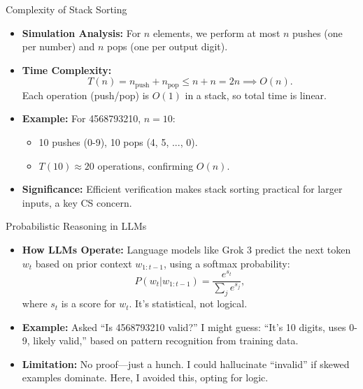 \begin{frame}{Complexity of Stack Sorting}
    \begin{itemize}
        \item \textbf{Simulation Analysis:} For \( n \) elements, we perform at most \( n \) pushes (one per number) and \( n \) pops (one per output digit).
        \item \textbf{Time Complexity:}
        \[
        T(n) = n_{\text{push}} + n_{\text{pop}} \leq n + n = 2n \implies O(n).
        \]
        Each operation (push/pop) is \( O(1) \) in a stack, so total time is linear.
        \item \textbf{Example:} For 4568793210, \( n = 10 \):
        \begin{itemize}
            \item 10 pushes (0-9), 10 pops (4, 5, ..., 0).
            \item \( T(10) \approx 20 \) operations, confirming \( O(n) \).
        \end{itemize}
        \item \textbf{Significance:} Efficient verification makes stack sorting practical for larger inputs, a key CS concern.
    \end{itemize}
\end{frame}

\begin{frame}{Probabilistic Reasoning in LLMs}
    \begin{itemize}
        \item \textbf{How LLMs Operate:} Language models like Grok 3 predict the next token \( w_t \) based on prior context \( w_{1:t-1} \), using a softmax probability:
        \[
        P(w_t | w_{1:t-1}) = \frac{e^{s_t}}{\sum_j e^{s_j}},
        \]
        where \( s_t \) is a score for \( w_t \). It’s statistical, not logical.
        \item \textbf{Example:} Asked “Is 4568793210 valid?” I might guess: “It’s 10 digits, uses 0-9, likely valid,” based on pattern recognition from training data.
        \item \textbf{Limitation:} No proof—just a hunch. I could hallucinate “invalid” if skewed examples dominate. Here, I avoided this, opting for logic.
    \end{itemize}
\end{frame}

